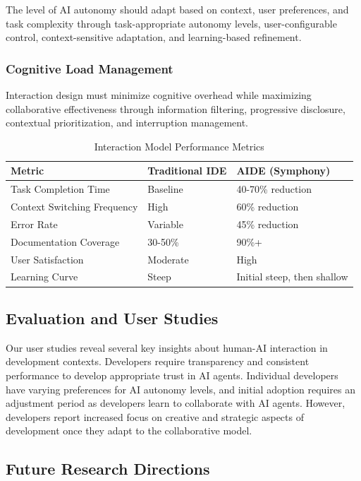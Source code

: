 The level of AI autonomy should adapt based on context, user preferences, and task complexity through task-appropriate autonomy levels, user-configurable control, context-sensitive adaptation, and learning-based refinement.

\subsubsection{Cognitive Load Management}

Interaction design must minimize cognitive overhead while maximizing collaborative effectiveness through information filtering, progressive disclosure, contextual prioritization, and interruption management.

\begin{table}[ht]
\centering
\begin{tabular}{@{}lll@{}}
\toprule
\textbf{Metric} & \textbf{Traditional IDE} & \textbf{AIDE (Symphony)} \\
\midrule
Task Completion Time & Baseline & 40-70\% reduction \\
Context Switching Frequency & High & 60\% reduction \\
Error Rate & Variable & 45\% reduction \\
Documentation Coverage & 30-50\% & 90\%+ \\
User Satisfaction & Moderate & High \\
Learning Curve & Steep & Initial steep, then shallow \\
\bottomrule
\end{tabular}
\caption{Interaction Model Performance Metrics}
\label{tab:interaction-metrics}
\end{table}

\subsection{Evaluation and User Studies}

Our user studies reveal several key insights about human-AI interaction in development contexts. Developers require transparency and consistent performance to develop appropriate trust in AI agents. Individual developers have varying preferences for AI autonomy levels, and initial adoption requires an adjustment period as developers learn to collaborate with AI agents. However, developers report increased focus on creative and strategic aspects of development once they adapt to the collaborative model.

\subsection{Future Research Directions}

